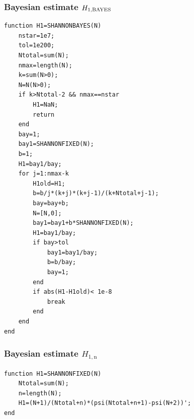 \documentclass[a4paper,10pt]{article}
\begin{document}
\begin{appendices}
\subsubsection{Bayesian estimate $ H_{1,\mbox{\scriptsize{BAYES}}}$ }
\ttfamily
\begin{lstlisting}
function H1=SHANNONBAYES(N)
    nstar=1e7;
    tol=1e200; 
    Ntotal=sum(N);
    nmax=length(N);
    k=sum(N>0);
    N=N(N>0);
    if k>Ntotal-2 && nmax==nstar
        H1=NaN;
        return
    end
    bay=1;
    bay1=SHANNONFIXED(N);
    b=1;
    H1=bay1/bay;
    for j=1:nmax-k
        H1old=H1;
        b=b/j*(k+j)*(k+j-1)/(k+Ntotal+j-1);
        bay=bay+b;
        N=[N,0];
        bay1=bay1+b*SHANNONFIXED(N);
        H1=bay1/bay;
        if bay>tol
            bay1=bay1/bay;
            b=b/bay;
            bay=1;
        end
        if abs(H1-H1old)< 1e-8
            break
        end
    end
end
\end{lstlisting}

\normalfont
\subsubsection{Bayesian estimate $ H_{1,\text{n}}$ }
\ttfamily
\begin{lstlisting}
function H1=SHANNONFIXED(N)
	Ntotal=sum(N);
	n=length(N);
	H1=(N+1)/(Ntotal+n)*(psi(Ntotal+n+1)-psi(N+2))';
end
\end{lstlisting}

\normalfont
\ttfamily
\begin{lstlisting}

\end{lstlisting}


\end{appendices}
\end{document}
